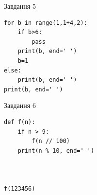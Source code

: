 \documentclass[12pt, ukrainian]{article}
\begin{document}
{\vspace{15mm}
\begin{minipage}[t]{9.7cm}                
{\begin{center}Завдання {5}\end{center}}
\begin{verbatim}
for b in range(1,1+4,2):
    if b>6:
        pass
    print(b, end=' ')
    b=1
else:
    print(b, end=' ')
print(b, end=' ')
\end{verbatim}     
\end{minipage}
\vline \hspace{8mm}
\begin{minipage}[t]{8.0cm}                
{\begin{center}Завдання {6}\end{center}}
\begin{verbatim}
def f(n):
    if n > 9:
        f(n // 100)
    print(n % 10, end=' ')
    


f(123456)
\end{verbatim}     
\end{minipage}

}
\newpage
\end{document}
